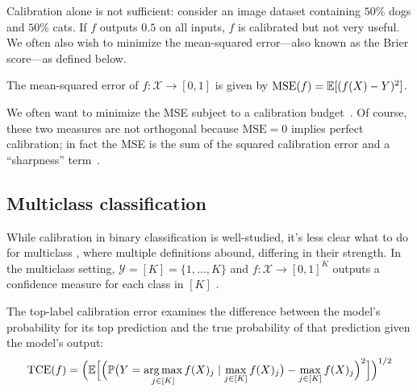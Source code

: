 

Calibration alone is not sufficient: consider an image dataset containing $50\%$ dogs and $50\%$ cats.
If $f$ outputs $0.5$ on all inputs, $f$ is calibrated but not very useful.
We often also wish to minimize the mean-squared error---also known as the Brier score---as defined below.

\begin{definition}
The mean-squared error of $f : \mathcal{X} \to [0, 1]$ is given by $\textup{MSE}(f) = \mathbb{E}[(f(X) - Y)^2]$.
\end{definition}

We often want to minimize the MSE subject to a calibration budget~\cite{gneiting2005weather, gneiting2007probabilistic}. Of course, these two measures are not orthogonal  because $\mbox{MSE} = 0$ implies perfect calibration; in fact the MSE is the sum of the squared calibration error and a ``sharpness'' term~\cite{murphy1973vector,degroot1983forecasters, kuleshov2015calibrated}.

\subsection{Multiclass classification}

While calibration in binary classification is  well-studied,
it's less clear what to do for multiclass , where multiple definitions abound, differing in their strength. In the multiclass setting, $\mathcal{Y} = [K] = \{1, \dots, K\}$ and $f : \mathcal{X} \to [0, 1]^K$ outputs a confidence measure for each class in $[K]$ .

\begin{definition}
The top-label calibration error examines the difference between the model's probability for its top prediction and the true probability of that prediction given the model's output:
\begin{align}
\textup{TCE}(f) = \Big( \mathbb{E}\Big[ \Big( \mathbb{P}\big(Y = \operatorname*{arg\,max}_{j \in [K]} f(X)_j \mid \max_{j \in [K]} f(X)_j\big) - \max_{j \in [K]} f(X)_j \Big)^2 \Big] \Big)^{1/2}
\end{align}
\end{definition}

